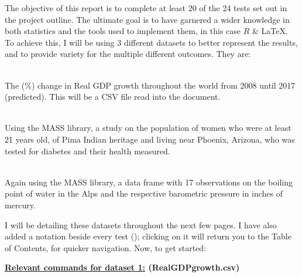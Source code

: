 \documentclass[12pt,a4paper]{article}
\begin{document}
\begin{titlepage}
\newpage
The objective of this report is to complete at least 20 of the 24 tests set out in the project outline. The ultimate goal is to have garnered a wider knowledge in both statistics and the tools used to implement them, in this case $R$ \& {\LaTeX}. To achieve this, I will be using 3 different datasets to better represent the results, and to provide variety for the multiple different outcomes. They are:
\begin{description}
\small
\item[1.] \hfill \\ The (\%) change in Real GDP growth throughout the world from 2008 until 2017 (predicted). This will be a CSV file read into the document.
\item[2.] \hfill \\ Using the MASS library, a study on the population of women who were at least 21 years old, of Pima Indian heritage and living near Phoenix, Arizona, who was tested for diabetes and their health measured.
\item[3.] \hfill \\ Again using the MASS library, a data frame with 17 observations on the boiling point of water in the Alps and the respective barometric pressure in inches of mercury.
\end{description}
I will be detailing these datasets throughout the next few pages. I have also added a notation beside every test (\pageref{label:BTP}); clicking on it will return you to the Table of Contents, for quicker navigation. Now, to get started:
\end{titlepage}
\newpage
\begin{center}{\textbf{\underline{Relevant commands for dataset 1:} (RealGDPgrowth.csv)}}\end{center}
\end{document}
